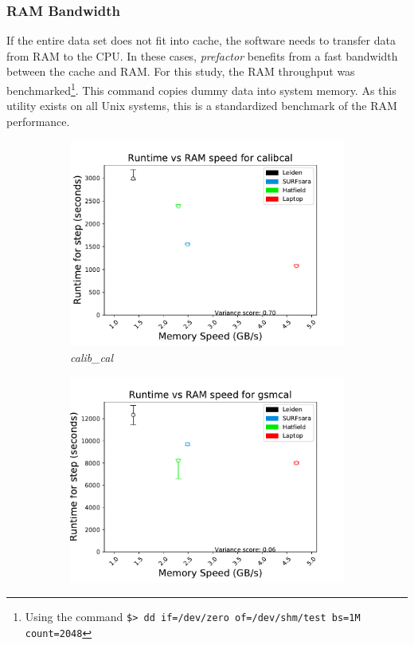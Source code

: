 \subsubsection{RAM Bandwidth}

If the entire data set does not fit into cache, the software needs to transfer data from RAM to the CPU. In these cases,  \textit{prefactor} benefits from a fast bandwidth between the cache and RAM. For this study, the RAM throughput was benchmarked\footnote{Using the command \texttt{\$> dd if=/dev/zero of=/dev/shm/test  bs=1M count=2048}}. This command copies dummy data into system memory. As this utility exists on all Unix systems, this is a standardized benchmark of the RAM performance. 

\begin{figure}
\centering
    \begin{subfigure}[b]{0.45\textwidth}
    \includegraphics[width=\linewidth]{ch4/figures/fig9/calibcal_MEM.pdf}
      \caption{\textit{calib\_cal}}
	\label{fig:ch4_calib_cal_RAM}
 \end{subfigure}%
  \begin{subfigure}{0.45\textwidth}
    \includegraphics[width=\linewidth]{ch4/figures/fig9/gsmcal_MEM.pdf}

\end{subfigure}
\end{figure}
